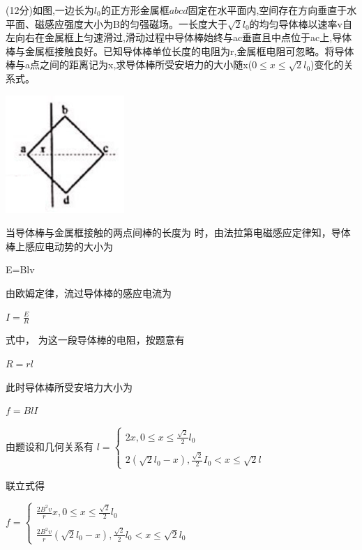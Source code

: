 \newpage
\question[6] (12分)如图,一边长为$l_0$的正方形金属框$abcd$固定在水平面内,空间存在方向垂直于水平面、磁感应强度大小为B的匀强磁场。一长度大于$\sqrt{2}l_{0}$的均匀导体棒以速率v自左向右在金属框上匀速滑过,滑动过程中导体棒始终与ac垂直且中点位于ac上,导体棒与金属框接触良好。已知导体棒单位长度的电阻为r,金属框电阻可忽略。将导体棒与a点之间的距离记为x,求导体棒所受安培力的大小随x($0\leqslant x\leqslant \sqrt{2}l_{0}$)变化的关系式。\begin{center}\includegraphics[]{img/image9.png}\end{center}
\begin{solution}{4cm}
当导体棒与金属框接触的两点间棒的长度为 时，由法拉第电磁感应定律知，导体棒上感应电动势的大小为

E=Blv

由欧姆定律，流过导体棒的感应电流为

$I= \frac{E}{R}$ 

式中， 为这一段导体棒的电阻，按题意有

$R = rl$

此时导体棒所受安培力大小为

$f = BlI$

由题设和几何关系有
$l= 
\begin{cases} 
    2x,0 \leqslant x \leqslant \frac{ \sqrt{2}}{2}l_{0}\\\\ 
    2( \sqrt{2}l_{0}-x), \frac{ \sqrt{2}}{2}I_{0}<x \leqslant \sqrt{2}l
\end{cases}     $   

联立式得

$f=
\begin{cases}
    \frac{2B^{2}v}{r}x,0 \leqslant x \leqslant \frac{ \sqrt{2}}{2}l_{0}\\\\
    \frac{2B^{2}v}{r}( \sqrt{2}l_{0}-x),\frac{ \sqrt{2}}{2}l_{0}<x \leqslant \sqrt{2}l_0
\end{cases}
$ 
\end{solution}

